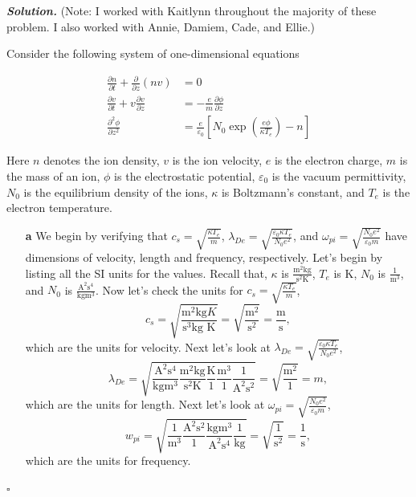\documentclass[12pt]{report}
\newenvironment{solution}[1][\it{Solution}]{\textbf{#1. } }{$\square$}
\newcommand{\pp}[2]{\frac{\partial #1}{\partial #2}} %
\newcommand{\ppn}[3]{\frac{\partial^{#1} #2}{\partial #3^{#1}}} %
\begin{document}
\begin{solution}
(Note: I worked with Kaitlynn throughout the majority of these problem. I also worked with Annie, Damiem, Cade, and Ellie.)

\noindent
Consider the following system of one-dimensional equations

\begin{align}
    \pp{n}{t}+\pp{}{z}(nv)&=0\\
    \pp{v}{t}+v\pp{v}{z}&=-\frac{e}{m}\pp{\phi}{z}\\
    \ppn{2}{\phi}{z}&= \frac{e}{\varepsilon_0}\left[N_0 \exp\left(\frac{e\phi}{\kappa T_e}\right)-n\right]
\end{align}


Here $n$ denotes the ion density, $v$ is the ion velocity, $e$ is the electron charge, $m$ is the
mass of an ion, $\phi$ is the electrostatic potential, $\varepsilon_0$ is the vacuum permittivity, $N_0$ is the
equilibrium density of the ions, $\kappa$ is Boltzmann's constant, and $T_e$ is the electron temperature.
\begin{enumerate}
    \item[{\bf a}]
    We begin by verifying that $c_s=\sqrt{\frac{\kappa T_e}{m}}$,
    $\lambda_{De}=\sqrt{\frac{\varepsilon_0 \kappa T_e}{N_0 e^2}}$, and
    $\omega_{pi}=\sqrt{\frac{N_0 e^2}{\varepsilon_0 m}}$ have dimensions of velocity, length and frequency, respectively. Let's begin by listing all the SI units for the values. Recall that, $\kappa$ is $\frac{\text{m}^2\text{kg}}{\text{s}^2\text{K}}$, $T_e$ is K, $N_0$ is $\frac{1}{\text{m}^3}$, and $N_0$ is $\frac{\text{A}^2\text{s}^4}{\text{kg}\text{m}^3}$. Now let's check the units for $c_s=\sqrt{\frac{\kappa T_e}{m}}$,
    \[
        c_s = \sqrt{\frac{\text{m}^2\text{kg}{K}}{\text{s}^3\text{kg K}}} = \sqrt{\frac{\text{m}^2}{\text{s}^2}} = \frac{\text{m}}{\text{s}},
    \]
    which are the units for velocity. Next let's look at $\lambda_{De}=\sqrt{\frac{\varepsilon_0 \kappa T_e}{N_0 e^2}}$,
    \[
        \lambda_{De} = \sqrt{\frac{\text{A}^2\text{s}^4}{\text{kg}\text{m}^3} \frac{\text{m}^2 \text{kg}}{\text{s}^2\text{K}} \frac{\text{K}}{1} \frac{\text{m}^3}{1} \frac{1}{\text{A}^2\text{s}^2}} = \sqrt{\frac{\text{m}^2}{1}} = m, 
    \]
    which are the units for length. Next let's look at $\omega_{pi}=\sqrt{\frac{N_0 e^2}{\varepsilon_0 m}}$,
    \[ 
        w_{pi} = \sqrt{\frac{1}{\text{m}^3}\frac{\text{A}^2\text{s}^2}{1}\frac{\text{kg}\text{m}^3}{\text{A}^2\text{s}^4} \frac{1}{\text{kg}}} = \sqrt{\frac{1}{\text{s}^2}} = \frac{1}{\text{s}},
    \]
    which are the units for frequency. 


\end{enumerate}
\end{solution}
\end{document}
